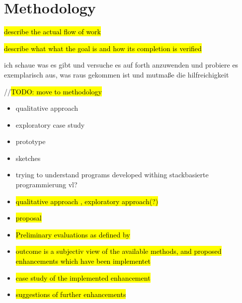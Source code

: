 \chapter{Methodology}
\label{chap:Methodology}

\hl{describe the actual flow of work}

\hl{describe what what the goal is and how its completion is verified}

ich schaue was es gibt und versuche es auf forth anzuwenden und probiere es exemplarisch aus, was raus gekommen ist und mutmaße die hilfreichigkeit

//\hl{TODO: move to methodology}
\begin{itemize}
\item qualitative approach
\item exploratory case study
\item prototype
\item sketches
\item trying to understand programs developed withing stackbasierte programmierung vl?

\item \hl{qualitative approach , exploratory approach(?)}
\item \hl{proposal}
\item \hl{Preliminary evaluations as defined by} \cite{Cornelissen:2009:SSP:1638616.1639301}
\item \hl{outcome is a subjectiv view of the available methods, and proposed enhancements which have been implementet}
\item \hl{case study of the implemented enhancement}
\item \hl{suggestions of further enhancements}
\end{itemize}